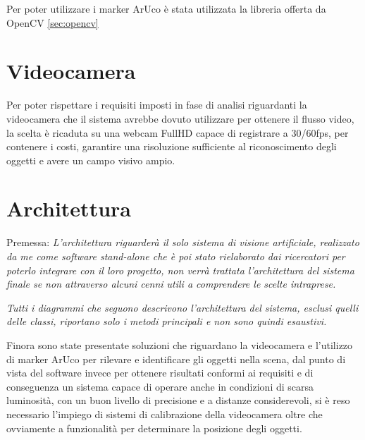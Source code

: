 \documentclass[12pt,a4paper,openright,twoside]{book}
\begin{document}
Per poter utilizzare i marker ArUco è stata utilizzata la libreria offerta da OpenCV \ref{sec:opencv}

\section{Videocamera}
Per poter rispettare i requisiti imposti in fase di analisi riguardanti la videocamera che il sistema avrebbe dovuto utilizzare per ottenere il flusso video, la scelta è ricaduta su una webcam FullHD capace di registrare a 30/60fps, per contenere i costi, garantire una risoluzione sufficiente al riconoscimento degli oggetti e avere un campo visivo ampio.

\section{Architettura}
Premessa: \textit{L'architettura riguarderà il solo sistema di visione artificiale, realizzato da me come software stand-alone che è poi stato rielaborato dai ricercatori per poterlo integrare con il loro progetto, non verrà trattata l'architettura del sistema finale se non attraverso alcuni cenni utili a comprendere le scelte intraprese.}
\vspace{0.5cm}

\textit{Tutti i diagrammi che seguono descrivono l'architettura del sistema, esclusi quelli delle classi, riportano solo i metodi principali e non sono quindi esaustivi.}
\vspace{0.5cm}

\noindent Finora sono state presentate soluzioni che riguardano la videocamera e l'utilizzo di marker ArUco per rilevare e identificare gli oggetti nella \gls{scena}, dal punto di vista del software invece per ottenere risultati conformi ai requisiti e di conseguenza un sistema capace di operare anche in condizioni di scarsa luminosità, con un buon livello di precisione e a distanze considerevoli, si è reso necessario l'impiego di sistemi di calibrazione della videocamera oltre che ovviamente a funzionalità per determinare la posizione degli oggetti.
\end{document}
